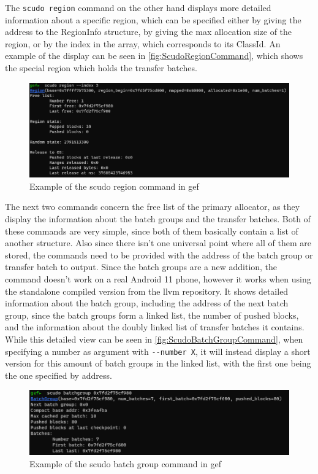 \documentclass[a4paper,11pt,oneside]{report}
\begin{document}
The \verb|scudo region| command on the other hand displays more detailed information
about a specific region, which can be specified either by giving the address
to the RegionInfo structure, by giving the max allocation size of the region,
or by the index in the array, which corresponds to its ClassId. An example of
the display can be seen in \autoref{fig:ScudoRegionCommand}, which shows the
special region which holds the transfer batches.

\begin{figure}[h!]
  \centering
  \includegraphics[width=\linewidth]{figures/ScudoRegionCommand.png}
  \caption{Example of the scudo region command in gef}
  \label{fig:ScudoRegionCommand}
\end{figure}

The next two commands concern the free list of the primary allocator, as they
display the information about the batch groups and the transfer batches. Both
of these commands are very simple, since both of them basically contain a list
of another structure. Also since there isn't one universal point where all of
them are stored, the commands need to be provided with the address of the
batch group or transfer batch to output.
Since the batch groups are a new addition, the command doesn't work on a real
Android 11 phone, however it works when using the standalone compiled version
from the llvm repository. It shows detailed information about the batch group,
including the address of the next batch group, since the batch groups form a
linked list, the number of pushed blocks, and the information about the doubly
linked list of transfer batches it contains. While this detailed view can be
seen in \autoref{fig:ScudoBatchGroupCommand}, when specifying a number as
argument with \verb|--number X|, it will instead display a short version for this
amount of batch groups in the linked list, with the first one being the one
specified by address.

\begin{figure}[h!]
  \centering
  \includegraphics[width=\linewidth]{figures/ScudoBatchGroupCommand.png}
  \caption{Example of the scudo batch group command in gef}
  \label{fig:ScudoBatchGroupCommand}
\end{figure}
\end{document}
